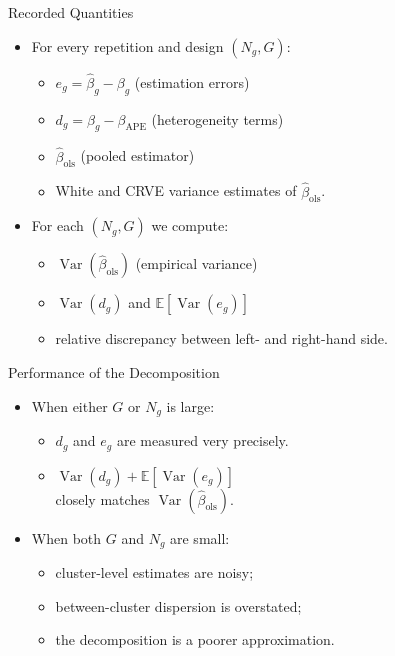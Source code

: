 \documentclass[
  ignorenonframetext,
]{beamer}
\providecommand{\tightlist}{%
  \setlength{\itemsep}{0pt}\setlength{\parskip}{0pt}}
\begin{document}
\begin{frame}{Recorded Quantities}
\label{recorded-quantities}
\begin{itemize}
\tightlist
\item
  For every repetition and design \((N_g,G)\):

  \begin{itemize}
  \tightlist
  \item
    \(e_g = \hat{\beta}_g - \beta_g\) (estimation errors)
  \item
    \(d_g = \beta_g - \beta_{\text{APE}}\) (heterogeneity terms)
  \item
    \(\hat{\beta}_{\text{ols}}\) (pooled estimator)
  \item
    White and CRVE variance estimates of \(\hat{\beta}_{\text{ols}}\).
  \end{itemize}
\item
  For each \((N_g,G)\) we compute:

  \begin{itemize}
  \tightlist
  \item
    \(\operatorname{Var}(\hat{\beta}_{\text{ols}})\) (empirical
    variance)
  \item
    \(\operatorname{Var}(d_g)\) and
    \(\mathbb{E}[\operatorname{Var}(e_g)]\)
  \item
    relative discrepancy between left- and right-hand side.
  \end{itemize}
\end{itemize}
\end{frame}

\begin{frame}{Performance of the Decomposition}
\label{performance-of-the-decomposition}
\begin{itemize}
\tightlist
\item
  When either \(G\) or \(N_g\) is large:

  \begin{itemize}
  \tightlist
  \item
    \(d_g\) and \(e_g\) are measured very precisely.
  \item
    \(\operatorname{Var}(d_g) + \mathbb{E}[\operatorname{Var}(e_g)]\)\\
    closely matches \(\operatorname{Var}(\hat{\beta}_{\text{ols}})\).
  \end{itemize}
\item
  When both \(G\) and \(N_g\) are small:

  \begin{itemize}
  \tightlist
  \item
    cluster-level estimates are noisy;
  \item
    between-cluster dispersion is overstated;
  \item
    the decomposition is a poorer approximation.
  \end{itemize}
\end{itemize}
\end{frame}
\end{document}
